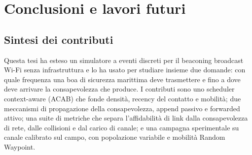 %
\chapter{Conclusioni e lavori futuri}
\label{ch:conclusioni}

\section{Sintesi dei contributi}
\label{sec:concl-contributi}
Questa tesi ha esteso un simulatore a eventi discreti per il beaconing broadcast
Wi-Fi senza infrastruttura e lo ha usato per studiare insieme due domande: con
quale frequenza una boa di sicurezza marittima deve trasmettere e fino a dove
deve arrivare la consapevolezza che produce. I contributi sono uno scheduler
context-aware (ACAB) che fonde densit\`a, recency del contatto e mobilit\`a; due
meccanismi di propagazione della consapevolezza, append passivo e forwarded
attivo; una suite di metriche che separa l'affidabilit\`a di link dalla
consapevolezza di rete, dalle collisioni e dal carico di canale; e una campagna
sperimentale su canale calibrato sul campo, con popolazione variabile e mobilit\`a
Random Waypoint.

